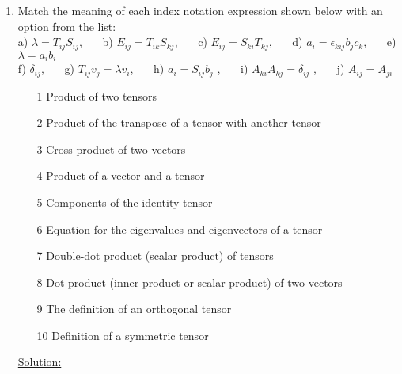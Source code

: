 \documentclass{article}
\newcommand{\bi}{\begin{itemize}}
\newcommand{\ei}{\end{itemize}}
\begin{document}
\begin{enumerate}
\item Match the meaning of each index notation expression shown below with an option from the list: \\
a) $\lambda =T_{ij}S_{ij}$, ~~~b)  $E_{ij}=T_{ik}S_{kj}$, ~~~c) $E_{ij}=S_{ki}T_{kj}$, ~~~d)  $a_i=\epsilon_{kij}b_j c_k$, ~~~e)  $\lambda=a_ib_i$ \\ 
f) $\delta_{ij}$, ~~~g) $T_{ij}v_j=\lambda v_i$, ~~~h) $a_i=S_{ij}b_j$ , ~~~i) $A_{ki}A_{kj}=\delta_{ij}$ , ~~~j) $A_{ij}=A_{ji}$ \\
\bi
\item[1] Product of two tensors
\item[2] Product of the transpose of a tensor with another tensor
\item[3] Cross product of two vectors
\item[4] Product of a vector and a tensor
\item[5] Components of the identity tensor
\item[6] Equation for the eigenvalues and eigenvectors of a tensor
\item[7] Double-dot product (scalar product) of tensors
\item[8] Dot product (inner product or scalar product) of two vectors
\item[9] The definition of an orthogonal tensor
\item[10] Definition of a symmetric tensor
\ei
\underline{Solution:}




\end{enumerate}
\end{document}
